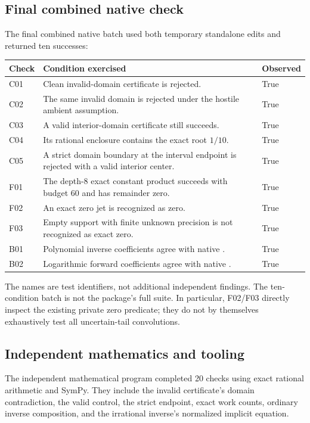 \documentclass[11pt,a4paper]{article}
\newcommand{\code}[1]{\texttt{\detokenize{#1}}}
\begin{document}
\subsection{Final combined native check}
The final combined native batch used both temporary standalone edits and returned ten successes:
\begin{longtable}{@{}P{0.12\textwidth}P{0.64\textwidth}P{0.16\textwidth}@{}}
\toprule Check & Condition exercised & Observed\\\midrule\endhead
C01 & Clean invalid-domain certificate is rejected. & True\\
C02 & The same invalid domain is rejected under the hostile ambient assumption. & True\\
C03 & A valid interior-domain certificate still succeeds. & True\\
C04 & Its rational enclosure contains the exact root $1/10$. & True\\
C05 & A strict domain boundary at the interval endpoint is rejected with a valid interior center. & True\\
F01 & The depth-8 exact constant product succeeds with budget 60 and has remainder zero. & True\\
F02 & An exact zero jet is recognized as zero. & True\\
F03 & Empty support with finite unknown precision is not recognized as exact zero. & True\\
B01 & Polynomial inverse coefficients agree with native \code{InverseSeries}. & True\\
B02 & Logarithmic forward coefficients agree with native \code{Series}. & True\\
\bottomrule
\end{longtable}
The names are test identifiers, not additional independent findings. The ten-condition batch is not the package's full \code{TestReport} suite. In particular, F02/F03 directly inspect the existing private zero predicate; they do not by themselves exhaustively test all uncertain-tail convolutions.

\subsection{Independent mathematics and tooling}
The independent mathematical program completed 20 checks using exact rational arithmetic and SymPy. They include the invalid certificate's domain contradiction, the valid control, the strict endpoint, exact work counts, ordinary inverse composition, and the irrational inverse's normalized implicit equation.
\end{document}
